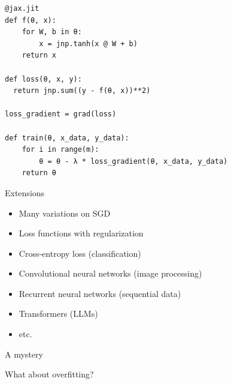 \begin{frame}[fragile]

    \begin{verbatim}
@jax.jit
def f(θ, x):
    for W, b in θ:
        x = jnp.tanh(x @ W + b)
    return x

def loss(θ, x, y):
  return jnp.sum((y - f(θ, x))**2)

loss_gradient = grad(loss)   

def train(θ, x_data, y_data):
    for i in range(m):
        θ = θ - λ * loss_gradient(θ, x_data, y_data)
    return θ
    \end{verbatim}

\end{frame}

\begin{frame}{Extensions}


    \begin{itemize}
        \item Many variations on SGD
        \vspace{0.5em}
        \item Loss functions with regularization
        \vspace{0.5em}
        \item Cross-entropy loss (classification)
        \vspace{0.5em}
        \item Convolutional neural networks (image processing)
        \vspace{0.5em}
        \item Recurrent neural networks (sequential data)
        \vspace{0.5em}
        \item Transformers (LLMs)
        \vspace{0.5em}
        \item etc.
    \end{itemize}
    
\end{frame}



\begin{frame}{A mystery}
    
    What about overfitting?

\end{frame}

